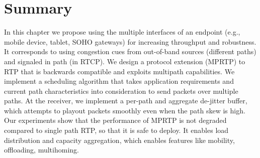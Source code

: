 


\section{Summary}

In this chapter we propose using the multiple interfaces of an endpoint (e.g.,
mobile device, tablet, SOHO gateways) for increasing throughput and
robustness. It corresponds to using congestion cues from out-of-band  sources
(different paths) and signaled in path (in RTCP). We design a protocol
extension (MPRTP) to RTP that is backwards compatible and exploits multipath
capabilities. We implement a scheduling algorithm that takes application
requirements and current path characteristics into consideration to send
packets over multiple paths. At the receiver, we implement a per-path and
aggregate de-jitter buffer, which attempts to playout packets smoothly even
when the path skew is high. Our experiments show that the performance of MPRTP
is not degraded compared to single path RTP, so that it is safe to deploy. It
enables load distribution and capacity aggregation, which enables features
like mobility, offloading, multihoming.

